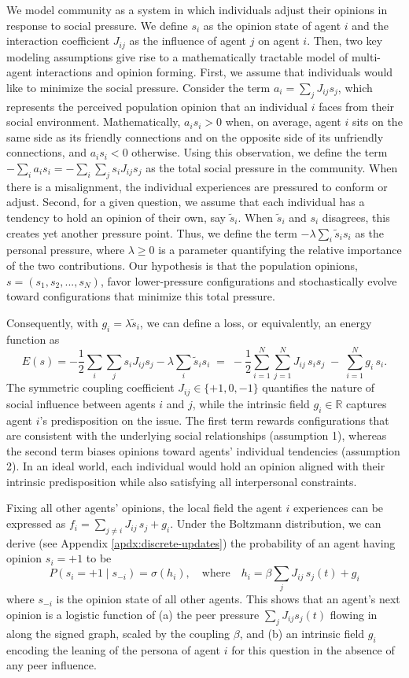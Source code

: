 
We model community as a system in which individuals adjust their opinions in response to social pressure. We define $s_i$ as the opinion state of agent $i$ and the interaction coefficient $J_{ij}$ as the influence of agent $j$ on agent $i$. Then, two key modeling assumptions give rise to a mathematically tractable model of multi-agent interactions and opinion forming. First, we assume that individuals would like to minimize the social pressure. Consider the term $a_i=\sum_j J_{ij}s_j$, which represents the perceived population opinion that an individual $i$ faces from their social environment. Mathematically, $a_i s_i > 0$ when, on average, agent $i$ sits on the same side as its friendly connections and on the opposite side of its unfriendly connections, and $a_i s_i < 0$ otherwise. Using this observation, we define the term $-\sum_i a_i s_i =-\sum_i \sum_j s_i J_{ij}s_j$ as the total social pressure in the community. When there is a misalignment, the individual experiences are pressured to conform or adjust. Second, for a given question, we assume that each individual has a tendency to hold an opinion of their own, say $\tilde s_i$. When $\tilde s_i$ and $s_i$ disagrees, this creates yet another pressure point. Thus, we define the term $-\lambda \sum_{i} \tilde s_i s_i$ as the personal pressure, where $\lambda\geq 0$ is a parameter quantifying the relative importance of the two contributions. Our hypothesis is that the population opinions, $s = (s_1, s_2, ... , s_N)$, favor lower-pressure configurations and stochastically evolve toward configurations that minimize this total pressure.

Consequently, with $g_i=\lambda \tilde s_i$, we can define a loss, or equivalently, an energy function as
$$
E(s) = -\frac{1}{2}\sum_i \sum_j s_i J_{ij}s_j - \lambda \sum_{i} \tilde s_i s_i \;=\; -\frac{1}{2} \sum_{i=1}^N \sum_{j=1}^N J_{ij}\,s_i s_j \;-\; \sum_{i=1}^N g_i\, s_i .
$$
The symmetric coupling coefficient $J_{ij} \in \{+1,0,-1\}$ quantifies the nature of social influence between agents $i$ and $j$, while the intrinsic field $g_i \in \mathbb R$ captures agent $i$'s predisposition on the issue. The first term rewards configurations that are consistent with the underlying social relationships (assumption 1), whereas the second term biases opinions toward agents' individual tendencies (assumption 2). In an ideal world, each individual would hold an opinion aligned with their intrinsic predisposition while also satisfying all interpersonal constraints. 

Fixing all other agents' opinions, the local field the agent $i$ experiences can be expressed as
\(f_i = \sum_{j\neq i} J_{ij}\,s_j + g_i
\). Under the Boltzmann distribution, we can derive (see Appendix \ref{apdx:discrete-updates})  the probability of an agent having opinion $s_i = +1$ to be
\[
P(s_i=+1\mid s_{-i})
= \sigma\!\left(h_i\right), \quad \text{where} \quad h_i = \beta \sum_{j} J_{ij}\,s_j(t) + g_i
\]
where $s_{-i}$ is the opinion state of all other agents. This shows that an agent's next opinion is a logistic function of (a) the peer pressure $\sum_j J_{ij}s_j(t)$ flowing in along the signed graph, scaled by the coupling $\beta$, and (b) an intrinsic field $g_i$ encoding the leaning of the persona of agent $i$ for this question in the absence of any peer influence.

